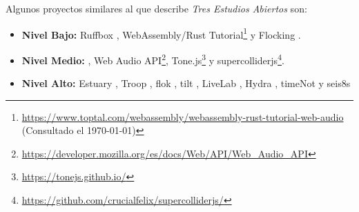 
Algunos proyectos similares al que describe \textit{Tres Estudios Abiertos} son: 

\begin{itemize}

\item \textbf{Nivel Bajo:} Ruffbox \citep{ruffbox}, WebAssembly/Rust Tutorial\footnote{\url{https://www.toptal.com/webassembly/webassembly-rust-tutorial-web-audio} (Consultado el \today)} y Flocking \citep{flocking}.
\item \textbf{Nivel Medio:} \citep{supercolliderweb}, Web Audio API\footnote{\url{https://developer.mozilla.org/es/docs/Web/API/Web_Audio_API}}, Tone.js\footnote{\url{https://tonejs.github.io/}} y supercolliderjs\footnote{\url{https://github.com/crucialfelix/supercolliderjs/}}.
\item \textbf{Nivel Alto:} Estuary \citep{estuary}, Troop \citep{Troop}, flok \citep{flok}, tilt \citep{tilt}, LiveLab \citep{livelab}, Hydra \citep{hydra}, timeNot \citep{timenot} y seis8s \citep{seis8s}
  
\end{itemize}

